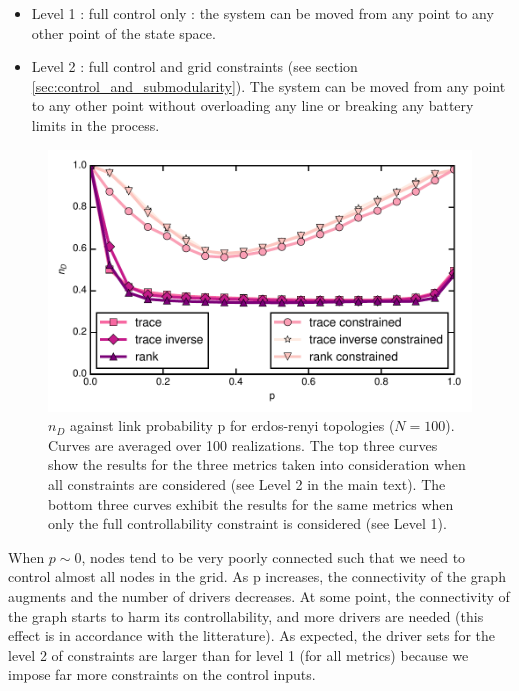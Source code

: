 \documentclass[conference]{IEEEtran}
\begin{document}
\begin{itemize}
\item Level 1 : full control only : the system can be moved from any point to any other point of the state space. 
\item Level 2 : full control and grid constraints (see section \ref{sec:control_and_submodularity}). The system can be moved from any point to any other point without overloading any line or breaking any battery limits in the process.
\end{itemize}

\begin{figure}
\includegraphics[scale=.55]{plot3.pdf}%
\caption{ $ n_D $ against link probability p for erdos-renyi topologies ($ N=100 $). Curves are averaged over 100 realizations. The top three curves show the results for the three metrics taken into consideration when all constraints are considered (see Level 2 in the main text). The bottom three curves exhibit the results for the same metrics when only the full controllability constraint is considered (see Level 1).}
\label{fig:erdos_renyi}
\end{figure}


When $p \sim 0$, nodes tend to be very poorly connected such that we need to control almost all nodes in the grid. As p increases, the connectivity of the graph augments and the number of drivers decreases. At some point, the connectivity of the graph starts to harm its controllability, and more drivers are needed (this effect is in accordance with the litterature). As expected, the driver sets for the level 2 of constraints are larger than for level 1 (for all metrics) because we impose far more constraints on the control inputs.
\end{document}
